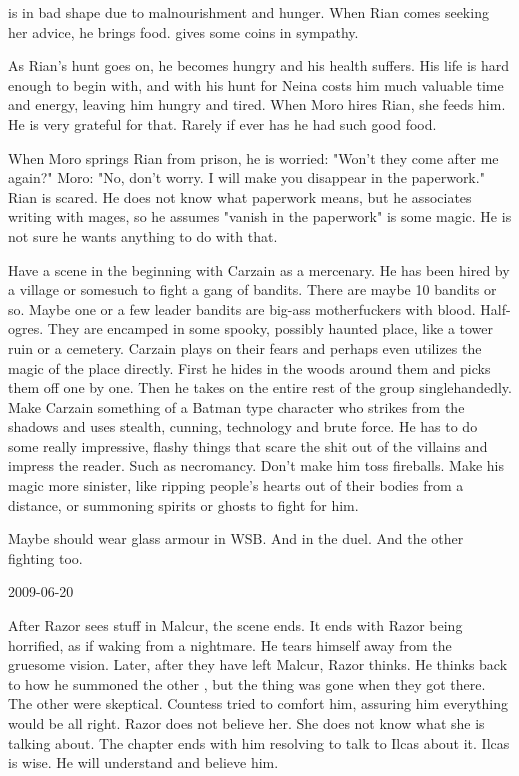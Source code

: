 \Uswa is in bad shape due to malnourishment and hunger.
When Rian comes seeking her advice, he brings food.
\Criseis gives \Uswa some coins in sympathy.

As Rian's hunt goes on, he becomes hungry and his health suffers.
His life is hard enough to begin with, and with his hunt for Neina costs him much valuable time and energy, leaving him hungry and tired. 
When Moro \Cornel hires Rian, she feeds him.
He is very grateful for that. 
Rarely if ever has he had such good food. 

When Moro springs Rian from prison, he is worried: "Won't they come after me again?"
Moro: "No, don't worry. I will make you disappear in the paperwork."
Rian is scared. He does not know what paperwork means, but he associates writing with mages, so he assumes "vanish in the paperwork" is some magic. 
He is not sure he wants anything to do with that.

Have a scene in the beginning with Carzain as a mercenary.
He has been hired by a village or somesuch to fight a gang of bandits. 
There are maybe 10 bandits or so. 
Maybe one or a few leader bandits are big-ass motherfuckers with \nephil blood.
Half-ogres.
They are encamped in some spooky, possibly haunted place, like a tower ruin or a cemetery.
Carzain plays on their fears and perhaps even utilizes the magic of the place directly. 
First he hides in the woods around them and picks them off one by one.
Then he takes on the entire rest of the group singlehandedly.
Make Carzain something of a Batman type character who strikes from the shadows and uses stealth, cunning, technology and brute force.
He has to do some really impressive, flashy things that scare the shit out of the villains and impress the reader. 
Such as necromancy.
Don't make him toss fireballs.
Make his magic more sinister, like ripping people's hearts out of their bodies from a distance, or summoning spirits or ghosts to fight for him.

Maybe \Teshrial should wear glass armour in WSB. 
And in the duel. 
And the other fighting \resphain too.



2009-06-20 

After Razor sees stuff in Malcur, the scene ends.
It ends with Razor being horrified, as if waking from a nightmare. 
He tears himself away from the gruesome vision.
Later, after they have left Malcur, Razor thinks.
He thinks back to how he summoned the other \nycans, but the thing was gone when they got there.
The other \nycans were skeptical.
Countess tried to comfort him, assuring him everything would be all right.
Razor does not believe her. 
She does not know what she is talking about. 
The chapter ends with him resolving to talk to Ilcas about it.
Ilcas is wise. 
He will understand and believe him.




